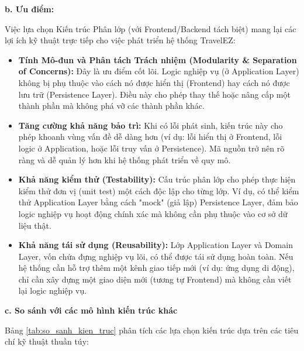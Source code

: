 \noindent\textbf{b. Ưu điểm:}\par
Việc lựa chọn Kiến trúc Phân lớp (với Frontend/Backend tách biệt) mang lại các lợi ích kỹ thuật trực tiếp cho việc phát triển hệ thống TravelEZ:
\begin{itemize}
    \item \textbf{Tính Mô-đun và Phân tách Trách nhiệm (Modularity \& Separation of Concerns):}
    Đây là ưu điểm cốt lõi. Logic nghiệp vụ (ở Application Layer) không bị phụ thuộc vào cách nó được hiển thị (Frontend)
    hay cách nó được lưu trữ (Persistence Layer). Điều này cho phép thay thế hoặc nâng cấp một thành phần mà không phá vỡ
    các thành phần khác.

    \item \textbf{Tăng cường khả năng bảo trì:}
    Khi có lỗi phát sinh, kiến trúc này cho phép khoanh vùng vấn đề dễ dàng hơn
    (ví dụ: lỗi hiển thị ở Frontend, lỗi logic ở Application, hoặc lỗi truy vấn ở Persistence).
    Mã nguồn trở nên rõ ràng và dễ quản lý hơn khi hệ thống phát triển về quy mô.

    \item \textbf{Khả năng kiểm thử (Testability):}
    Cấu trúc phân lớp cho phép thực hiện kiểm thử đơn vị (unit test) một cách độc lập cho từng lớp.
    Ví dụ, có thể kiểm thử Application Layer bằng cách "mock" (giả lập) Persistence Layer,
    đảm bảo logic nghiệp vụ hoạt động chính xác mà không cần phụ thuộc vào cơ sở dữ liệu thật.

    \item \textbf{Khả năng tái sử dụng (Reusability):}
    Lớp Application Layer và Domain Layer, vốn chứa đựng nghiệp vụ lõi, có thể được tái sử dụng hoàn toàn.
    Nếu hệ thống cần hỗ trợ thêm một kênh giao tiếp mới (ví dụ: ứng dụng di động),
    chỉ cần xây dựng một giao diện mới (tương tự Frontend) mà không cần viết lại logic nghiệp vụ.
\end{itemize}

\noindent\textbf{c. So sánh với các mô hình kiến trúc khác}\par
Bảng \ref{tab:so_sanh_kien_truc} phân tích các lựa chọn kiến trúc dựa trên các tiêu chí kỹ thuật thuần túy:

